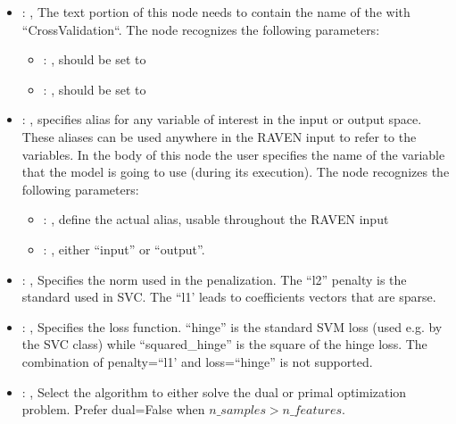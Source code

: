 \begin{itemize}
    \item {}: , 
      The text portion of this node needs to contain the name of the  with
               ``CrossValidation``.
      The  node recognizes the following parameters:
        \begin{itemize}
          \item {}: , 
            should be set to 
          \item {}: , 
            should be set to 
      \end{itemize}

    \item {}: , 
      specifies alias for         any variable of interest in the input or output space. These
      aliases can be used anywhere in the RAVEN input to         refer to the variables. In the body
      of this node the user specifies the name of the variable that the model is going to use
      (during its execution).
      The  node recognizes the following parameters:
        \begin{itemize}
          \item {}: , 
            define the actual alias, usable throughout the RAVEN input
          \item {}: , 
            either ``input'' or ``output''.
      \end{itemize}

    \item {}: \xmlDesc{[l1, l2]}, 
      Specifies the norm used in the penalization. The ``l2'' penalty is the standard used in SVC.
      The ``l1' leads to coefficients vectors that are sparse.

    \item {}: , 
      Specifies the loss function. ``hinge'' is the standard SVM loss (used e.g. by the SVC class)
      while ``squared\_hinge'' is the square of the hinge loss. The combination of penalty=``l1' and
      loss=``hinge''                                                  is not supported.

    \item {}: , 
      Select the algorithm to either solve the dual or primal optimization problem.
      Prefer dual=False when $n\_samples > n\_features$.


\end{itemize}
